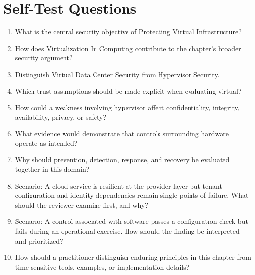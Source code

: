 \documentclass[11pt]{article}
\begin{document}
\section*{Self-Test Questions}
\begin{enumerate}
\item What is the central security objective of Protecting Virtual Infrastructure?
\item How does Virtualization In Computing contribute to the chapter's broader security argument?
\item Distinguish Virtual Data Center Security from Hypervisor Security.
\item Which trust assumptions should be made explicit when evaluating virtual?
\item How could a weakness involving hypervisor affect confidentiality, integrity, availability, privacy, or safety?
\item What evidence would demonstrate that controls surrounding hardware operate as intended?
\item Why should prevention, detection, response, and recovery be evaluated together in this domain?
\item Scenario: A cloud service is resilient at the provider layer but tenant configuration and identity dependencies remain single points of failure. What should the reviewer examine first, and why?
\item Scenario: A control associated with software passes a configuration check but fails during an operational exercise. How should the finding be interpreted and prioritized?
\item How should a practitioner distinguish enduring principles in this chapter from time-sensitive tools, examples, or implementation details?
\end{enumerate}
\end{document}
